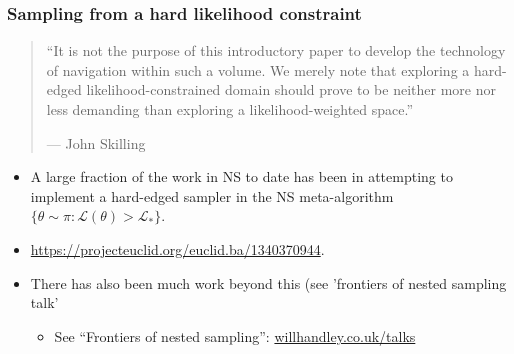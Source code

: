 \documentclass[aspectratio=169]{beamer}
\begin{document}
\begin{frame}
\begin{columns}
    \end{columns}
\end{frame}

\begin{frame}
  \frametitle{Sampling from a hard likelihood constraint} 
  
  \begin{quote}
    ``It is not the purpose of this introductory paper to develop the technology of navigation within such a volume. We merely note that exploring a hard-edged likelihood-constrained domain should prove to be neither more nor less demanding than exploring a likelihood-weighted space.''
    
   {\hfill --- John Skilling}
  \end{quote}

  \begin{itemize}
      
    \item A large fraction of the work in NS to date has been in attempting to implement a hard-edged sampler in the NS meta-algorithm $\{\theta\sim \pi : \mathcal{L}(\theta)>\mathcal{L}_* \}$.
    \item \url{https://projecteuclid.org/euclid.ba/1340370944}.
    \item There has also been much work beyond this (see 'frontiers of nested sampling talk' 
        \begin{itemize}
            \item See ``Frontiers of nested sampling'': \href{https://www.willhandley.co.uk/talks}{willhandley.co.uk/talks}
        \end{itemize}
  \end{itemize}
 
\end{frame}
\end{document}
